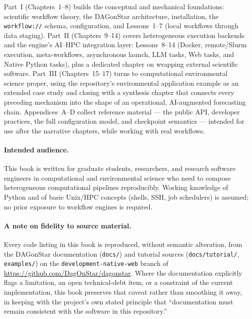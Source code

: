 Part~I (Chapters~1--8) builds the conceptual and mechanical foundations:
scientific workflow theory, the DAGonStar architecture, installation, the
\texttt{workflow://} schema, configuration, and Lessons~1--7 (local workflows
through data staging). Part~II (Chapters~9--14) covers heterogeneous execution
backends and the engine's AI--HPC integration layer: Lessons~8--14 (Docker,
remote/Slurm execution, meta-workflows, asynchronous launch, LLM tasks, Web
tasks, and Native Python tasks), plus a dedicated chapter on wrapping external
scientific software. Part~III (Chapters~15--17) turns to computational
environmental science proper, using the repository's environmental
application example as an extended case study and closing with a synthesis
chapter that connects every preceding mechanism into the shape of an
operational, AI-augmented forecasting chain. Appendices~A--D collect reference
material --- the public API, developer practices, the full configuration
model, and checkpoint semantics --- intended for use after the narrative
chapters, while working with real workflows.

\paragraph{Intended audience.}
This book is written for graduate students, researchers, and research software
engineers in computational and environmental science who need to compose
heterogeneous computational pipelines reproducibly. Working knowledge of
Python and of basic Unix/HPC concepts (shells, SSH, job schedulers) is
assumed; no prior exposure to workflow engines is required.

\paragraph{A note on fidelity to source material.}
Every code listing in this book is reproduced, without semantic alteration,
from the DAGonStar documentation (\texttt{docs/}) and tutorial sources
(\texttt{docs/tutorial/}, \texttt{examples/}) on the
\texttt{development-native-web} branch of
\url{https://github.com/DagOnStar/dagonstar}. Where the documentation
explicitly flags a limitation, an open technical-debt item, or a constraint of
the current implementation, this book preserves that caveat rather than
smoothing it away, in keeping with the project's own stated principle that
``documentation must remain consistent with the software in this
repository.''

